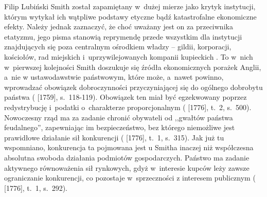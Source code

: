 \begin{artplenv}{Filip Lubiński}
Smith został zapamiętany w~dużej mierze jako krytyk instytucji, którym wytykał ich wątpliwe podstawy etyczne bądź
katastrofalne ekonomiczne efekty. Należy jednak zaznaczyć, że choć uważany jest on za przeciwnika etatyzmu, jego pisma
stanowią reprymendę przede wszystkim dla instytucji znajdujących się poza centralnym ośrodkiem władzy -- gildii,
korporacji, kościołów, rad miejskich i~uprzywilejowanych kompanii kupieckich
\parencite[s.~108]{rothschild_economic_2002}.
To w~nich w~pierwszej kolejności Smith doszukuje się źródła ekonomicznych porażek Anglii, a~nie w
ustawodawstwie państwowym, które może, a~nawet powinno, wprowadzać obowiązek dobroczynności przyczyniającej się do
ogólnego dobrobytu państwa
(\cite{smith_teoria_1989} [1759], s.~118-119).
Obowiązek ten miał być
egzekwowany poprzez redystrybucję i~podatki o~charakterze proporcjonalnym
(\cite{smith_badania_2007} [1776], t.~2, s.~500).
Nowoczesny rząd ma za zadanie chronić obywateli od ,,gwałtów państwa
feudalnego'', zapewniając im bezpieczeństwo, bez którego niemożliwe jest prawidłowe działanie sił konkurencji
(\cite{smith_badania_2007} [1776], t.~1, s.~315).
Jak już tu wspomniano, konkurencja ta pojmowana jest u
Smitha inaczej niż współczesna absolutna swoboda działania podmiotów gospodarczych. Państwo ma zadanie aktywnego
równoważenia sił rynkowych, gdyż w~interesie kupców leży zawsze ograniczanie konkurencji, co pozostaje w~sprzeczności z
interesem publicznym
(\cite{smith_badania_2007} [1776], t.~1, s.~292).


\end{artplenv}
